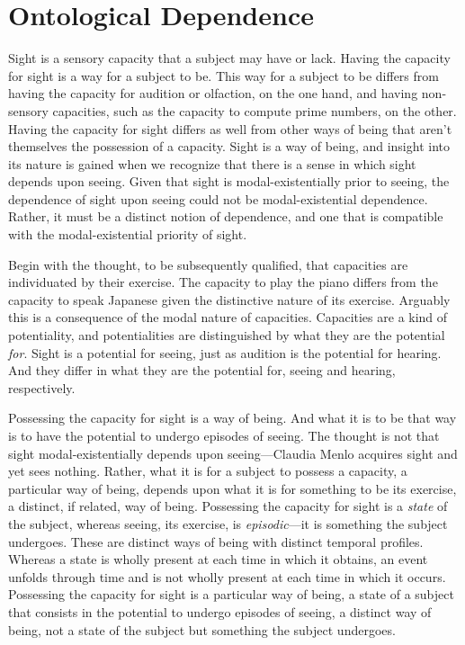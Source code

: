 \documentclass[12pt]{article}
\begin{document}

\section{Ontological Dependence} %
\label{sec:ontological_dependence}

Sight is a sensory capacity that a subject may have or lack. Having the capacity for sight is a way for a subject to be. This way for a subject to be differs from having the capacity for audition or olfaction, on the one hand, and having non-sensory capacities, such as the capacity to compute prime numbers, on the other. Having the capacity for sight differs as well from other ways of being that aren't themselves the possession of a capacity. Sight is a way of being, and insight into its nature is gained when we recognize that there is a sense in which sight depends upon seeing. Given that sight is modal-existentially prior to seeing, the dependence of sight upon seeing could not be modal-existential dependence. Rather, it must be a distinct notion of dependence, and one that is compatible with the modal-existential priority of sight.

Begin with the thought, to be subsequently qualified, that capacities are individuated by their exercise. The capacity to play the piano differs from the capacity to speak Japanese given the distinctive nature of its exercise. Arguably this is a consequence of the modal nature of capacities. Capacities are a kind of potentiality, and potentialities are distinguished by what they are the potential \emph{for}. Sight is a potential for seeing, just as audition is the potential for hearing. And they differ in what they are the potential for, seeing and hearing, respectively. 

Possessing the capacity for sight is a way of being. And what it is to be that way is to have the potential to undergo episodes of seeing. The thought is not that sight modal-existentially depends upon seeing---Claudia Menlo acquires sight and yet sees nothing. Rather, what it is for a subject to possess a capacity, a particular way of being, depends upon what it is for something to be its exercise, a distinct, if related, way of being. Possessing the capacity for sight is a \emph{state} of the subject, whereas seeing, its exercise, is \emph{episodic}---it is something the subject undergoes. These are distinct ways of being with distinct temporal profiles. Whereas a state is wholly present at each time in which it obtains, an event unfolds through time and is not wholly present at each time in which it occurs. Possessing the capacity for sight is a particular way of being, a state of a subject that consists in the potential to undergo episodes of seeing, a distinct way of being, not a state of the subject but something the subject undergoes. 
\end{document}

